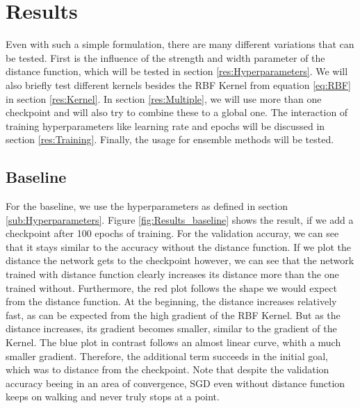 \chapter{Results}
Even with such a simple formulation, there are many different variations that
can be tested. First is the influence of the strength and width parameter of the
distance function, which will be tested in section \ref{res:Hyperparameters}. We
will also briefly test different kernels besides the RBF Kernel from equation
\ref{eq:RBF} in section \ref{res:Kernel}. In section \ref{res:Multiple}, we will
use more than one checkpoint and will also try to combine these to a global one.
The interaction of training hyperparameters like learning rate and epochs will
be discussed in section \ref{res:Training}. Finally, the usage for ensemble
methods will be tested.

\section{Baseline}\label{res:Baseline}
For the baseline, we use the hyperparameters as defined in section
\ref{sub:Hyperparameters}. Figure \ref{fig:Results_baseline} shows the result,
if we add a checkpoint after 100 epochs of training. For the validation accuray,
we can see that it stays similar to the accuracy without the distance function.
If we plot the distance the network gets to the checkpoint however, we can see
that the network trained with distance function clearly increases its distance
more than the one trained without. Furthermore, the red plot follows the shape
we would expect from the distance function. At the beginning, the distance
increases relatively fast, as can be expected from the high gradient of the RBF
Kernel. But as the distance increases, its gradient becomes smaller, similar to
the gradient of the Kernel. The blue plot in contrast follows an almost linear
curve, whith a much smaller gradient. Therefore, the additional term succeeds in
the initial goal, which was to distance from the checkpoint. Note that despite
the validation accuracy beeing in an area of convergence, SGD even without
distance function keeps on walking and never truly stops at a point.

